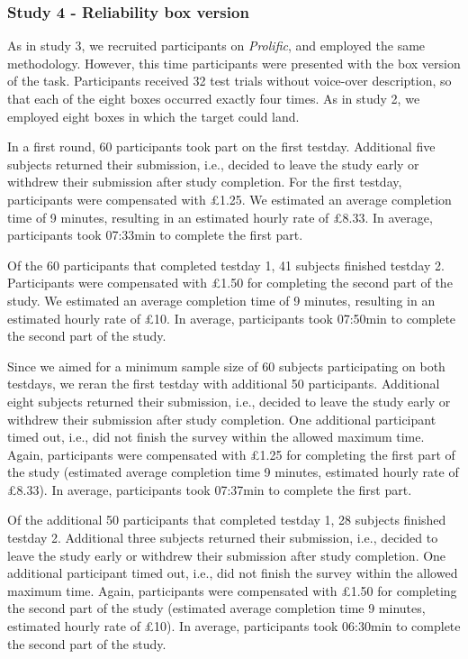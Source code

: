 \documentclass[
  english,
  man,floatsintext]{apa6}
\begin{document}
\hypertarget{study-4---reliability-box-version}{%
\subsubsection{Study 4 - Reliability box version}\label{study-4---reliability-box-version}}

As in study 3, we recruited participants on \emph{Prolific}, and employed the same methodology. However, this time participants were presented with the box version of the task. Participants received 32 test trials without voice-over description, so that each of the eight boxes occurred exactly four times. As in study 2, we employed eight boxes in which the target could land.

In a first round, 60 participants took part on the first testday. Additional five subjects returned their submission, i.e., decided to leave the study early or withdrew their submission after study completion. For the first testday, participants were compensated with £1.25. We estimated an average completion time of 9 minutes, resulting in an estimated hourly rate of £8.33. In average, participants took 07:33min to complete the first part.

Of the 60 participants that completed testday 1, 41 subjects finished testday 2. Participants were compensated with £1.50 for completing the second part of the study. We estimated an average completion time of 9 minutes, resulting in an estimated hourly rate of £10. In average, participants took 07:50min to complete the second part of the study.

Since we aimed for a minimum sample size of 60 subjects participating on both testdays, we reran the first testday with additional 50 participants. Additional eight subjects returned their submission, i.e., decided to leave the study early or withdrew their submission after study completion. One additional participant timed out, i.e., did not finish the survey within the allowed maximum time. Again, participants were compensated with £1.25 for completing the first part of the study (estimated average completion time 9 minutes, estimated hourly rate of £8.33). In average, participants took 07:37min to complete the first part.

Of the additional 50 participants that completed testday 1, 28 subjects finished testday 2. Additional three subjects returned their submission, i.e., decided to leave the study early or withdrew their submission after study completion. One additional participant timed out, i.e., did not finish the survey within the allowed maximum time. Again, participants were compensated with £1.50 for completing the second part of the study (estimated average completion time 9 minutes, estimated hourly rate of £10). In average, participants took 06:30min to complete the second part of the study.
\end{document}
